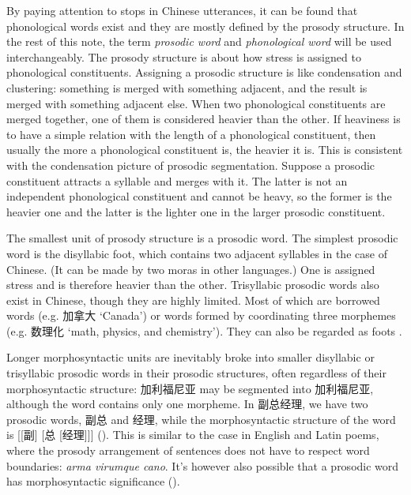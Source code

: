 \documentclass[UTF8, a4paper, oneside, scheme=plain]{ctexrep}
\newcommand*{\citesec}[1]{\S~{#1}}
\newcommand*{\term}[1]{\emph{#1}}
\newcommand{\corpus}[1]{\emph{#1}}
\newcommand{\translate}[1]{`#1'}
\begin{document}
By paying attention to stops in Chinese utterances,
it can be found that phonological words exist and they are mostly defined by the prosody structure.
In the rest of this note,
the term \term{prosodic word} and \term{phonological word}
will be used interchangeably.
The prosody structure is about how stress is assigned to phonological constituents.
Assigning a prosodic structure is like condensation and clustering:
something is merged with something adjacent,
and the result is merged with something adjacent else.
When two phonological constituents are merged together,
one of them is considered heavier than the other.
If heaviness is to have a simple relation with the length of a phonological constituent,
then usually the more a phonological constituent is,
the heavier it is.
This is consistent with the condensation picture of prosodic segmentation.
Suppose a prosodic constituent attracts a syllable and merges with it.
The latter is not an independent phonological constituent
and cannot be heavy,
so the former is the heavier one and the latter is the lighter one in the larger prosodic constituent.

The smallest unit of prosody structure 
is a prosodic word.
The simplest prosodic word is the disyllabic foot, 
which contains two adjacent syllables in the case of Chinese.
(It can be made by two moras in other languages.)
One is assigned stress and is therefore heavier than the other.
Trisyllabic prosodic words also exist in Chinese,
though they are highly limited.
Most of which are borrowed words (e.g. 加拿大 \translate{Canada})
or words formed by coordinating three morphemes (e.g. 数理化 \translate{math, physics, and chemistry}).
They can also be regarded as foots \citep[\citesec{2.2}]{feng2000}.

Longer morphosyntactic units are 
inevitably broke into smaller disyllabic or trisyllabic prosodic words
in their prosodic structures,
often regardless of their morphosyntactic structure:
加利福尼亚 may be segmented into 加利\textbar 福尼亚, 
although the word contains only one morpheme.
In 副总经理,
we have two prosodic words,
副总 and 经理,
while the morphosyntactic structure of the word is [[副] [总 [经理]]]
().
This is similar to the case in English and Latin poems,
where the prosody arrangement of sentences does not have to respect word boundaries:
\corpus{arma vi\textbar rumque ca\textbar no}.
It's however also possible that 
a prosodic word has morphosyntactic significance
().
\end{document}
